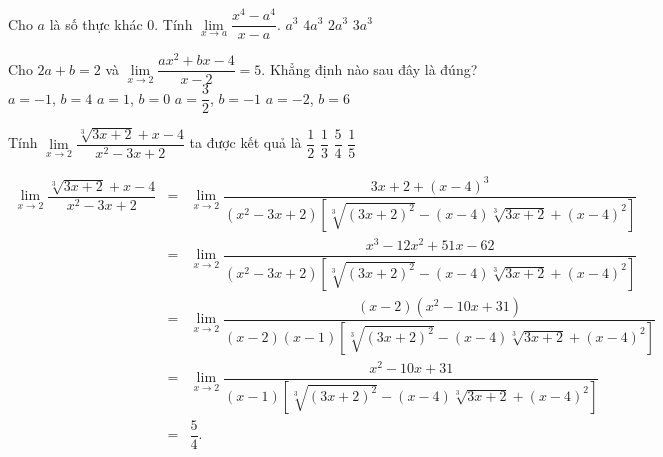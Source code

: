 
\begin{ex}%
	Cho $a$ là số thực khác $0$. Tính $\lim\limits_{ x\to a} \dfrac{x^4 -a^4}{x-a}$.
	\choice
	{$a^3$}
	{\True $4a^3$}
	{$2a^3$}
	{$3a^3$}
\end{ex}

\begin{ex}%
	Cho $ 2a+b=2 $ và $ \lim\limits_{x \to 2} \dfrac{ax^2+bx-4}{x-2}=5$. Khẳng định nào sau đây là đúng?
	\choice
	{$a=-1$, $b=4$}
	{$a=1$, $b=0$}
	{\True $a=\dfrac{3}{2}$, $b=-1$}
	{$a=-2$, $b=6$}
\end{ex}

\begin{ex}%
	Tính $\lim\limits_{x \to 2}\dfrac{\sqrt[3]{3x+2} + x - 4}{x^2 - 3x + 2}$ ta được kết quả là
	\choice
	{$\dfrac{1}{2}$}
	{$\dfrac{1}{3}$}
	{\True $\dfrac{5}{4}$}
	{$\dfrac{1}{5}$}
	\loigiai
	{
		\allowdisplaybreaks
		\begin{eqnarray*}
			\lim\limits_{x \to 2}\dfrac{\sqrt[3]{3x+2} + x - 4}{x^2 - 3x + 2} &=& \lim\limits_{x \to 2}\dfrac{3x + 2 + (x-4)^3}{(x^2 - 3x + 2)\left[\sqrt[3]{(3x+2)^2} - (x-4)\sqrt[3]{3x+2} + (x-4)^2\right]}\\
			&=& \lim\limits_{x \to 2}\dfrac{x^3 - 12x^2 + 51x - 62}{(x^2 - 3x + 2)\left[\sqrt[3]{(3x+2)^2} - (x-4)\sqrt[3]{3x+2} + (x-4)^2\right]}\\
			&=& \lim\limits_{x \to 2}\dfrac{(x-2)(x^2 - 10x + 31)}{(x-2)(x-1)\left[\sqrt[3]{(3x+2)^2} - (x-4)\sqrt[3]{3x+2} + (x-4)^2\right]}\\
			&=& \lim\limits_{x \to 2}\dfrac{x^2 - 10x + 31}{(x-1)\left[\sqrt[3]{(3x+2)^2} - (x-4)\sqrt[3]{3x+2} + (x-4)^2\right]}\\
			&=& \dfrac{5}{4}.
		\end{eqnarray*}
		
	}
\end{ex}	

